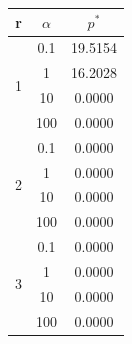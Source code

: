 \documentclass[11pt]{article}
\begin{document}
\begin{homeworkProblem}
    \begin{table}[h!]
        \centering
        \begin{tabular}{|c|c|c|}
            \hline
            r                  & $\alpha$ & $p^*$   \\
            \hline
            \multirow{4}{*}{1} & 0.1      & 19.5154 \\
                               & 1        & 16.2028 \\
                               & 10       & 0.0000  \\
                               & 100      & 0.0000  \\
            \hline
            \multirow{4}{*}{2} & 0.1      & 0.0000  \\
                               & 1        & 0.0000  \\
                               & 10       & 0.0000  \\
                               & 100      & 0.0000  \\
            \hline
            \multirow{4}{*}{3} & 0.1      & 0.0000  \\
                               & 1        & 0.0000  \\
                               & 10       & 0.0000  \\
                               & 100      & 0.0000  \\
            \hline
        \end{tabular}

    \end{table}

\end{homeworkProblem}

\pagebreak
\end{document}
